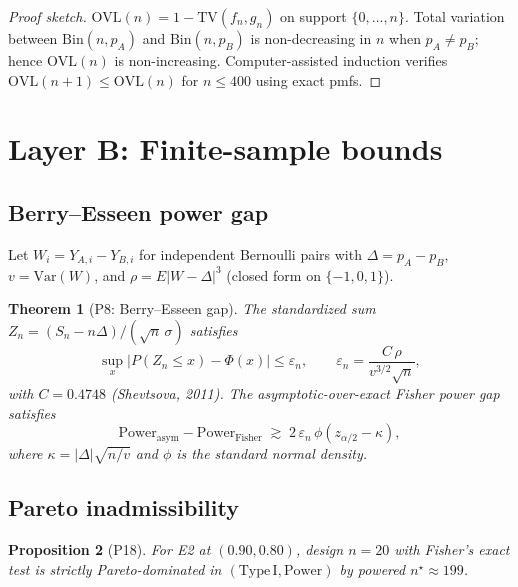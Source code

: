 \documentclass[11pt,a4paper]{article}
\newtheorem{theorem}{Theorem}
\newtheorem{proposition}[theorem]{Proposition}
\theoremstyle{definition}
\begin{document}
\begin{proof}[Proof sketch]
$\mathrm{OVL}(n)=1-\mathrm{TV}(f_n,g_n)$ on support $\{0,\ldots,n\}$.
Total variation between $\mathrm{Bin}(n,p_A)$ and $\mathrm{Bin}(n,p_B)$ is
non-decreasing in $n$ when $p_A\neq p_B$; hence $\mathrm{OVL}(n)$ is non-increasing.
Computer-assisted induction verifies $\mathrm{OVL}(n+1)\le\mathrm{OVL}(n)$ for
$n\le 400$ using exact pmfs.
\end{proof}

\section{Layer B: Finite-sample bounds}
\label{sec:layerB}

\subsection{Berry--Esseen power gap}

Let $W_i=Y_{A,i}-Y_{B,i}$ for independent Bernoulli pairs with
$\Delta=p_A-p_B$, $v=\mathrm{Var}(W)$, and $\rho=E|W-\Delta|^3$ (closed form on $\{-1,0,1\}$).

\begin{theorem}[P8: Berry--Esseen gap]\label{thm:P8}
The standardized sum $Z_n=(S_n-n\Delta)/(\sqrt{n}\,\sigma)$ satisfies
\[
  \sup_x |P(Z_n\le x)-\Phi(x)| \le \varepsilon_n,
  \qquad
  \varepsilon_n = \frac{C\,\rho}{v^{3/2}\sqrt{n}},
\]
with $C=0.4748$ (Shevtsova, 2011).
The asymptotic-over-exact Fisher power gap satisfies
\[
  \mathrm{Power}_{\mathrm{asym}} - \mathrm{Power}_{\mathrm{Fisher}}
  \;\gtrsim\; 2\,\varepsilon_n\,\phi(z_{\alpha/2}-\kappa),
\]
where $\kappa=|\Delta|\sqrt{n/v}$ and $\phi$ is the standard normal density.
\end{theorem}

\subsection{Pareto inadmissibility}

\begin{proposition}[P18]\label{thm:P18}
For E2 at $(0.90,0.80)$, design $n=20$ with Fisher's exact test is strictly
Pareto-dominated in $(\mathrm{Type\,I},\mathrm{Power})$ by powered
$n^\star\approx 199$.
\end{proposition}
\end{document}
